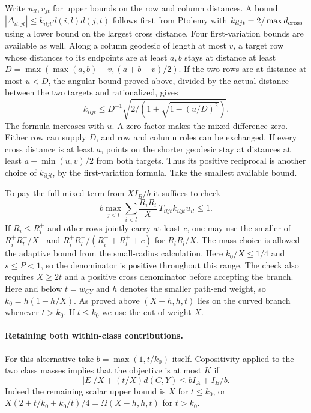 \documentclass[11pt,a4paper]{article}
\theoremstyle{definition}
\begin{document}
Write $u_{il},v_{jt}$ for upper bounds on the row and column distances.
A bound $|\Delta_{il;jt}|\le k_{iljt}d(i,l)d(j,t)$ follows first from
Ptolemy with $k_{iljt}=2/\max d_{\rm cross}$ using a lower bound on
the largest cross distance. Four first-variation bounds are available
as well. Along a column geodesic of length at most $v$, a target row
whose distances to its endpoints are at least $a,b$ stays at distance
at least $D=\max(\max(a,b)-v,(a+b-v)/2)$. If the two rows are at
distance at most $u<D$, the angular bound proved above, divided by the
actual distance between the two targets and rationalized, gives
\[
              k_{iljt}\le D^{-1}
                    \sqrt{2/(1+\sqrt{1-(u/D)^2})}.
\]
The formula increases with $u$. A zero factor makes the mixed difference
zero. Either row can supply $D$, and row and column roles can be exchanged.
If every cross distance is at least $a$, points on the shorter geodesic
stay at distances at least $a-\min(u,v)/2$ from both targets. Thus its
positive reciprocal is another choice of $k_{iljt}$, by the
first-variation formula. Take the smallest available bound.

To pay the full mixed term from $XI_B/b$ it suffices to check
\begin{equation}\label{eq:seven-signed}
 b\max_{j<t}\sum_{i<l}
       \frac{R_i R_l}{X}\,T_{iljt} k_{iljt} u_{il}\le1 .
\end{equation}
If $R_i\le R_i^+$ and other rows jointly carry at least $c$, one may use
the smaller of $R_i^+R_l^+/X_-$ and
$R_i^+R_l^+/(R_i^++R_l^++c)$ for $R_iR_l/X$.
The mass choice is allowed the adaptive bound from the small-radius
calculation. Here $k_0/X\le1/4$ and $s\le P<1$, so the denominator is
positive throughout this range. The check also requires $X\ge2t$
and a positive cross denominator before accepting the branch.
Here and below $t=w_{CY}$ and $h$ denotes the smaller path-end weight,
so $k_0=h(1-h/X)$. As proved above $(X-h,h,t)$ lies on the curved
branch whenever $t>k_0$. If $t\le k_0$ we use the cut of weight $X$.

\paragraph{Retaining both within-class contributions.}
For this alternative take $b=\max(1,t/k_0)$ itself. Copositivity applied
to the two class masses implies that the objective is at most $K$ if
\[
              |E|/X+(t/X)d(C,Y)\le b I_A+I_B/b .
\]
Indeed the remaining scalar upper bound is $X$ for $t\le k_0$, or
$X(2+t/k_0+k_0/t)/4=\Omega(X-h,h,t)$ for $t>k_0$.
\end{document}
